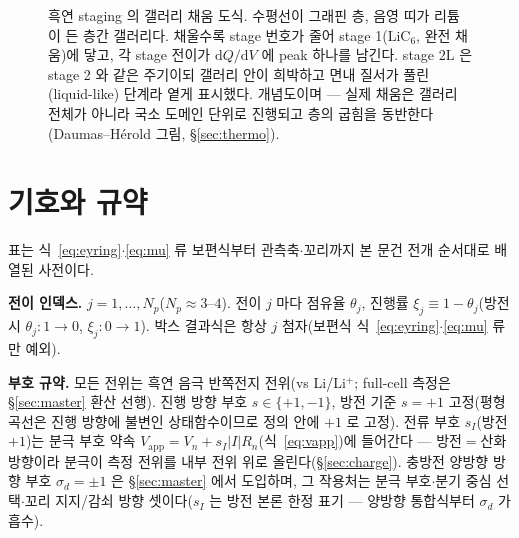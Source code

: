 \documentclass[11pt,a4paper]{article}
\newcommand{\dd}{\mathrm{d}}
\newcommand{\app}{\mathrm{app}}
\begin{document}
\begin{figure}[t]
\caption{흑연 staging 의 갤러리 채움 도식. 수평선이 그래핀 층, 음영 띠가 리튬이 든 층간
갤러리다. 채울수록 stage 번호가 줄어 stage 1($\mathrm{LiC_6}$, 완전 채움)에 닿고, 각 stage 전이가
$\dd Q/\dd V$ 에 peak 하나를 남긴다. stage $2\mathrm L$ 은 stage 2 와 같은 주기이되 갤러리 안이
희박하고 면내 질서가 풀린(liquid-like) 단계라 옅게 표시했다. 개념도이며 — 실제 채움은 갤러리 전체가
아니라 국소 도메인 단위로 진행되고 층의 굽힘을 동반한다(Daumas--H\'erold 그림, \S\ref{sec:thermo}).}
\label{fig:staging}
\end{figure}

\tableofcontents
\newpage

\section{기호와 규약}\label{sec:notation}
표는 식~\eqref{eq:eyring}$\cdot$\eqref{eq:mu} 류 보편식부터 관측축$\cdot$꼬리까지 본 문건 전개 순서대로 배열된 사전이다.

\textbf{전이 인덱스.} $j=1,\dots,N_p$($N_p\approx3\text{--}4$). 전이 $j$ 마다 점유율 $\theta_j$, 진행률 $\xi_j\equiv1-\theta_j$(방전 시 $\theta_j:1\to0$, $\xi_j:0\to1$). 박스 결과식은 항상 $j$ 첨자(보편식 식~\eqref{eq:eyring}$\cdot$\eqref{eq:mu} 류만 예외).

\textbf{부호 규약.} 모든 전위는 흑연 음극 반쪽전지 전위(vs Li/Li$^+$; full-cell 측정은 \S\ref{sec:master} 환산 선행). 진행 방향 부호 $s\in\{+1,-1\}$, 방전 기준 $s=+1$ 고정(평형 곡선은 진행 방향에 불변인 상태함수이므로 정의 안에 $+1$ 로 고정). 전류 부호 $s_I$(방전 $+1$)는 분극 부호 약속 $V_\app=V_n+s_I|I|R_n$(식~\eqref{eq:vapp})에 들어간다 — 방전$=$산화 방향이라 분극이 측정 전위를 내부 전위 위로 올린다(\S\ref{sec:charge}). 충방전 양방향 방향 부호 $\sigma_d=\pm1$ 은 \S\ref{sec:master} 에서 도입하며, 그 작용처는 분극 부호$\cdot$분기 중심 선택$\cdot$꼬리 지지/감쇠 방향 셋이다($s_I$ 는 방전 본론 한정 표기 — 양방향 통합식부터 $\sigma_d$ 가 흡수).
\end{document}
